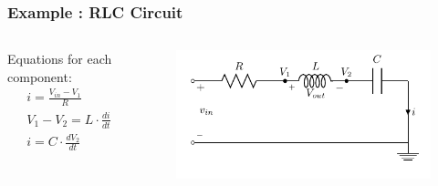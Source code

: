 \begin{frame}
	
	\frametitle{Example : RLC Circuit}
	
	\begin{columns}
		\begin{column}{0.4\linewidth}
			Equations for each component:
			\begin{align*}
			&i = \frac{V_{in} - V_{1}}{R} \\
			&V_1 - V_2 = L \cdot \frac{di}{dt} \\
			&i = C \cdot \frac{dV_2}{dt} \\
			\end{align*}
		\end{column}
		\begin{column}{0.6\linewidth}
			\begin{figure}
				\centering
				\includegraphics[width=1\linewidth]{img/circuit-RLC}
				\label{fig:circuit-RLC-small}
			\end{figure}
		\end{column}
		
	\end{columns}
	
\end{frame}

